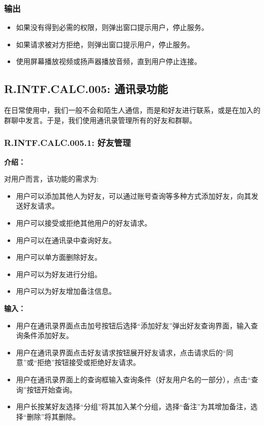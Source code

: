 \subsubsection{输出}
\begin{itemize}
  \item 如果没有得到必需的权限，则弹出窗口提示用户，停止服务。
  \item 如果请求被对方拒绝，则弹出窗口提示用户，停止服务。
  \item 使用屏幕播放视频或扬声器播放音频，直到用户停止连接。
\end{itemize}

\subsection{R.INTF.CALC.005: 通讯录功能}
在日常使用中，我们一般不会和陌生人通信，而是和好友进行联系，或是在加入的群聊中发言。于是，我们使用通讯录管理所有的好友和群聊。

\subsubsection{R.INTF.CALC.005.1: 好友管理}
\textbf{介绍：}

对用户而言，该功能的需求为:
\begin{itemize}
  \item 用户可以添加其他人为好友，可以通过账号查询等多种方式添加好友，向其发送好友请求。
  \item 用户可以接受或拒绝其他用户的好友请求。
  \item 用户可以在通讯录中查询好友。
  \item 用户可以单方面删除好友。
  \item 用户可以为好友进行分组。
  \item 用户可以为好友增加备注信息。
\end{itemize}

\textbf{输入：}

\begin{itemize}
  \item 用户在通讯录界面点击加号按钮后选择“添加好友”弹出好友查询界面，输入查询条件添加好友。
  \item 用户在通讯录界面点击好友请求按钮展开好友请求，点击请求后的“同意”或“拒绝”按钮接受或拒绝好友请求。
  \item 用户在通讯录界面上的查询框输入查询条件（好友用户名的一部分），点击“查询”按钮开始查询。
  \item 用户长按某好友选择“分组”将其加入某个分组，选择“备注”为其增加备注，选择“删除”将其删除。
\end{itemize}

